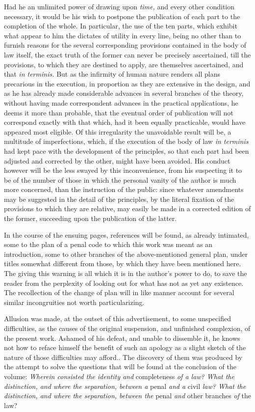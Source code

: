 \documentclass[12pt]{report}
\begin{document}
Had he an unlimited power of drawing upon \emph{time,} and every other
condition necessary, it would be his wish to postpone the publication of
each part to the completion of the whole. In particular, the use of the
ten parts, which exhibit what appear to him the dictates of utility in
every line, being no other than to furnish reasons for the several
corresponding provisions contained in the body of law itself, the exact
truth of the former can never be precisely ascertained, till the
provisions, to which they are destined to apply, are themselves
ascertained, and that \emph{in terminis.} But as the infirmity of human
nature renders all plans precarious in the execution, in proportion as
they are extensive in the design, and as he has already made
considerable advances in several branches of the theory, without having
made correspondent advances in the practical applications, he deems it
more than probable, that the eventual order of publication will not
correspond exactly with that which, had it been equally practicable,
would have appeared most eligible. Of this irregularity the unavoidable
result will be, a multitude of imperfections, which, if the execution of
the body of law \emph{in terminis} had kept pace with the development of
the principles, so that each part had been adjusted and corrected by the
other, might have been avoided. His conduct however will be the less
swayed by this inconvenience, from his suspecting it to be of the number
of those in which the personal vanity of the author is much more
concerned, than the instruction of the public: since whatever amendments
may be suggested in the detail of the principles, by the literal
fixation of the provisions to which they are relative, may easily be
made in a corrected edition of the former, succeeding upon the
publication of the latter.

In the course of the ensuing pages, references will be found, as already
intimated, some to the plan of a penal code to which this work was meant
as an introduction, some to other branches of the above-mentioned
general plan, under titles somewhat different from those, by which they
have been mentioned here. The giving this warning is all which it is in
the author's power to do, to save the reader from the perplexity of
looking out for what has not as yet any existence. The recollection of
the change of plan will in like manner account for several similar
incongruities not worth particularizing.

Allusion was made, at the outset of this advertisement, to some
unspecified difficulties, as the causes of the original suspension, and
unfinished complexion, of the present work. Ashamed of his defeat, and
unable to dissemble it, he knows not how to reface himself the benefit
of such an apology as a slight sketch of the nature of those
difficulties may afford.. The discovery of them was produced by the
attempt to solve the questions that will be found at the conclusion of
the volume: \emph{Wherein consisted the identity and} completeness
\emph{of a law? What the distinction, and where the separation, between
a} penal \emph{and a} civil \emph{law? What the distinction, and where
the separation, between the} penal \emph{and} other branches \emph{of}
the law?
\end{document}
